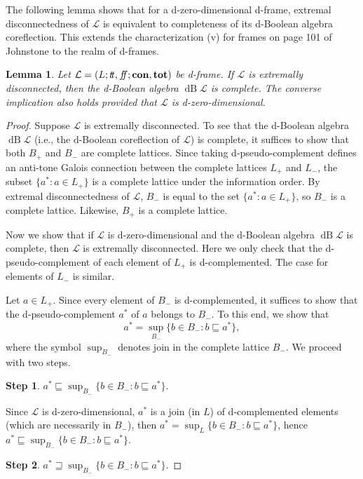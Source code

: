 \documentclass[11pt]{article}
\DeclareMathOperator{\dB}{dB}
\theoremstyle{plain}
\newtheorem{lem}[thm]{Lemma}
\theoremstyle{definition}
\newcommand{\dbt}{{t\!t}}
\newcommand{\dbf}{{f\!\!f}}
\begin{document}
The following lemma shows that for a d-zero-dimensional d-frame, extremal disconnectedness of $\mathcal{L}$ is equivalent to completeness of its d-Boolean algebra coreflection. This extends the characterization (v) for frames on page 101 of Johnstone \cite{Johnstone} to the realm of d-frames.

\begin{lem} \label{complete dBA vs extremal discon} Let $\mathcal{L}=(L;\dbt,\dbf;{\bf con},{\bf tot})$ be  d-frame.   If  $\mathcal{L}$  is extremally disconnected, then the d-Boolean algebra $\dB\mathcal{L}$ is complete.
The converse implication also holds provided that   $\mathcal{L}$ is d-zero-dimensional.  
\end{lem}

\begin{proof} Suppose $\mathcal{L}$ is extremally disconnected. To see that the d-Boolean algebra $\dB\mathcal{L}$ (i.e., the d-Boolean coreflection of $\mathcal{L}$) is complete, it suffices to show that both $B_+$ and $B_-$ are complete lattices. Since taking d-pseudo-complement defines an anti-tone Galois connection between the complete lattices $L_+$ and $L_-$, the subset $\{a^*:a\in L_+\}$  is a complete lattice under the information order. By extremal disconnectedness of $\mathcal{L}$, $B_-$ is equal to the set $\{a^*:a\in L_+\}$, so $B_-$ is a complete lattice. Likewise, $B_+$ is a complete lattice. 

Now we show that if $\mathcal{L}$ is d-zero-dimensional and the d-Boolean algebra $\dB\mathcal{L}$ is complete, then $\mathcal{L}$ is extremally disconnected. Here we only check that the d-pseudo-complement  of each element of $L_+$ is d-complemented. The case for elements of $L_-$ is similar. 

Let $a\in L_+$. Since every element of $B_-$ is d-complemented, it suffices to show that the d-pseudo-complement $a^*$ of $a$ belongs to $B_-$. To this end, we show that  $$a^*={\sup}_{B_-} \{b\in B_{-}:b\sqsubseteq a^*\},$$ where the symbol ${\sup}_{B_-}$ denotes  join  in the complete lattice $B_-$. We proceed with two steps. 

{\bf Step 1}.   $a^*\sqsubseteq{\sup}_{B_-} \{b\in B_{-}:b\sqsubseteq a^*\}$. 

Since $\mathcal{L}$ is d-zero-dimensional, $a^*$ is a join (in $L$) of d-complemented elements (which are necessarily in $B_-$), then $a^*=\sup_L \{b\in B_{-}:b\sqsubseteq a^*\}$, hence $a^*\sqsubseteq{\sup}_{B_-} \{b\in B_{-}:b\sqsubseteq a^*\}.$   

{\bf Step 2}.   $a^*\sqsupseteq{\sup}_{B_-} \{b\in B_{-}:b\sqsubseteq a^*\}$. 


\end{proof}
\end{document}
